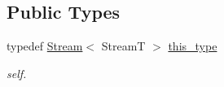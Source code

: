\subsection*{Public Types}
\begin{DoxyCompactItemize}
\item 
\hypertarget{classhryky_1_1reduction_1_1_stream_a714a0ce48465fdee8152b02787cc49a8}{typedef \hyperlink{classhryky_1_1reduction_1_1_stream}{Stream}$<$ Stream\-T $>$ \hyperlink{classhryky_1_1reduction_1_1_stream_a714a0ce48465fdee8152b02787cc49a8}{this\-\_\-type}}\label{classhryky_1_1reduction_1_1_stream_a714a0ce48465fdee8152b02787cc49a8}

\begin{DoxyCompactList}\small\item\em self. \end{DoxyCompactList}\end{DoxyCompactItemize}
